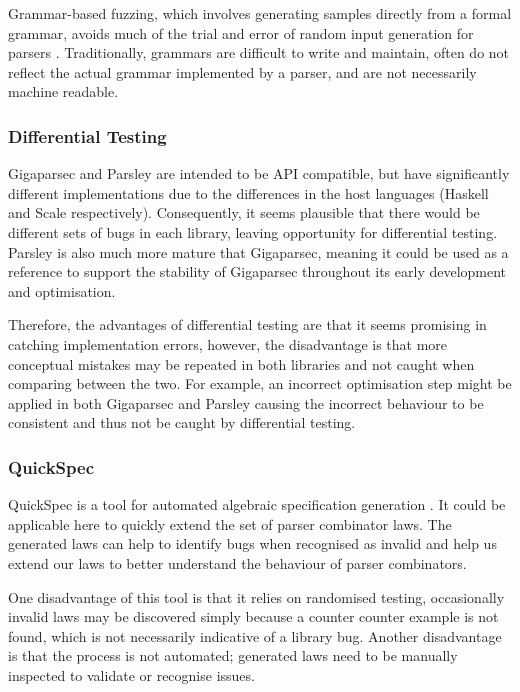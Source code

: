 \documentclass[11pt]{article}
\begin{document}
Grammar-based fuzzing, which involves generating samples directly from a formal grammar, avoids much of the trial and error of random input generation for parsers \cite{grammar}. Traditionally, grammars are difficult to write and maintain, often do not reflect the actual grammar implemented by a parser, and are not necessarily machine readable.

\subsubsection{Differential Testing}
Gigaparsec and Parsley are intended to be API compatible, but have significantly different implementations due to the differences in the host languages (Haskell and Scale respectively). Consequently, it seems plausible that there would be different sets of bugs in each library, leaving opportunity for differential testing. Parsley is also much more mature that Gigaparsec, meaning it could be used as a reference to support the stability of Gigaparsec throughout its early development and optimisation.

Therefore, the advantages of differential testing are that it seems promising in catching implementation errors, however, the disadvantage is that more conceptual mistakes may be repeated in both libraries and not caught when comparing between the two. For example, an incorrect optimisation step might be applied in both Gigaparsec and Parsley causing the incorrect behaviour to be consistent and thus not be caught by differential testing.

\subsubsection{QuickSpec}

QuickSpec is a tool for automated algebraic specification generation \cite{quickspec}. It could be applicable here to quickly extend the set of parser combinator laws. The generated laws can help to identify bugs when recognised as invalid and help us extend our laws to better understand the behaviour of parser combinators.

One disadvantage of this tool is that it relies on randomised testing, occasionally invalid laws may be discovered simply because a counter counter example is not found, which is not necessarily indicative of a library bug. Another disadvantage is that the process is not automated; generated laws need to be manually inspected to validate or recognise issues.
\end{document}
